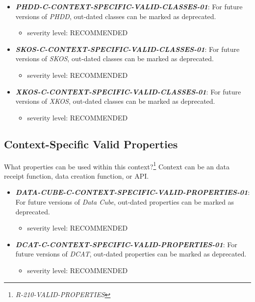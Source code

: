 \documentclass{llncs}
\begin{document}
\begin{itemize}
	\item \textbf{{\em PHDD-C-CONTEXT-SPECIFIC-VALID-CLASSES-01}}: For future versions of \emph{PHDD}, out-dated classes can be marked as deprecated.
	\begin{itemize}
		\item severity level: RECOMMENDED
	\end{itemize}
\end{itemize}

\begin{itemize}
	\item \textbf{{\em SKOS-C-CONTEXT-SPECIFIC-VALID-CLASSES-01}}: For future versions of \emph{SKOS}, out-dated classes can be marked as deprecated.
	\begin{itemize}
		\item severity level: RECOMMENDED
	\end{itemize}
\end{itemize}

\begin{itemize}
	\item \textbf{{\em XKOS-C-CONTEXT-SPECIFIC-VALID-CLASSES-01}}: For future versions of \emph{XKOS}, out-dated classes can be marked as deprecated.
	\begin{itemize}
		\item severity level: RECOMMENDED
	\end{itemize}
\end{itemize}

\subsection{Context-Specific Valid Properties}

What properties can be used within this context?\footnote{\emph{R-210-VALID-PROPERTIES}} 
Context can be an data receipt function, data creation function, or API.

\begin{itemize}
	\item \textbf{{\em DATA-CUBE-C-CONTEXT-SPECIFIC-VALID-PROPERTIES-01}}: For future versions of \emph{Data Cube}, out-dated properties can be marked as deprecated.
	\begin{itemize}
		\item severity level: RECOMMENDED
	\end{itemize}
\end{itemize}

\begin{itemize}
	\item \textbf{{\em DCAT-C-CONTEXT-SPECIFIC-VALID-PROPERTIES-01}}: For future versions of \emph{DCAT}, out-dated properties can be marked as deprecated.
	\begin{itemize}
		\item severity level: RECOMMENDED
	\end{itemize}
\end{itemize}
\end{document}
